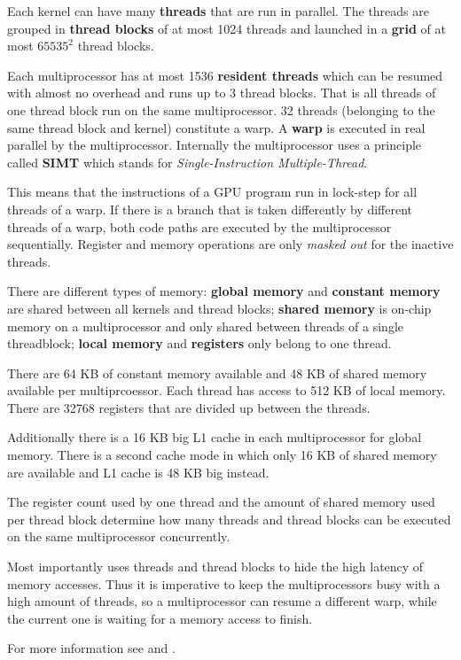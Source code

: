 Each kernel can have many \textbf{threads} that are run in parallel. The threads are grouped in \textbf{thread blocks} of at most 1024 threads and launched in a \textbf{grid} of at most $65535^2$ thread blocks.

Each multiprocessor has at most 1536 \textbf{resident threads} which can be resumed with almost no overhead and runs up to 3 thread blocks. That is all threads of one thread block run on the same multiprocessor. 32 threads (belonging to the same thread block and kernel) constitute a warp. A \textbf{warp} is executed in real parallel by the multiprocessor. Internally the multiprocessor uses a principle called \textbf{SIMT} which stands for \textit{Single-Instruction Multiple-Thread}.

This means that the instructions of a GPU program run in lock-step for all threads of a warp. If there is a branch that is taken differently by different threads of a warp, both code paths are executed by the multiprocessor sequentially. Register and memory operations are only \textit{masked out} for the inactive threads.

There are different types of memory: \textbf{global memory} and \textbf{constant memory} are shared between all kernels and thread blocks; \textbf{shared memory} is on-chip memory on a multiprocessor and only shared between threads of a single threadblock; \textbf{local memory} and \textbf{registers} only belong to one thread.

There are 64 KB of constant memory available and 48 KB of shared memory available per multiprcoessor. Each thread has access to 512 KB of local memory. There are 32768 registers that are divided up between the threads.

Additionally there is a 16 KB big L1 cache in each multiprocessor for global memory. There is a second cache mode in which only 16 KB of shared memory are available and L1 cache is 48 KB big instead.

The register count used by one thread and the amount of shared memory used per thread block determine how many threads and thread blocks can be executed on the same multiprocessor concurrently.

Most importantly \cuda{} uses threads and thread blocks to hide the high latency of memory accesses. Thus it is imperative to keep the multiprocessors busy with a high amount of threads, so a multiprocessor can resume a different warp, while the current one is waiting for a memory access to finish.

For more information see \cite{cuda11progguide} and \cite{cuda11bestpract}.